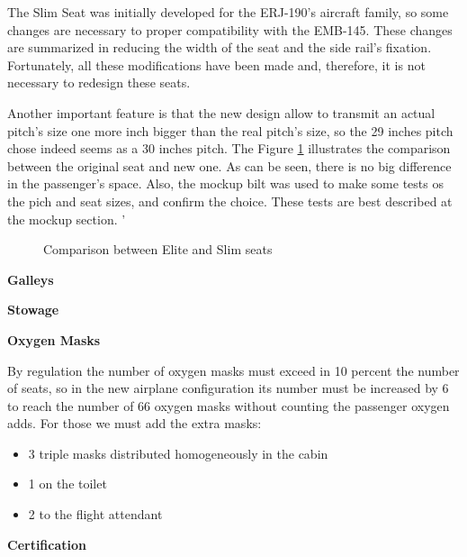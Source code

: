 The Slim Seat was initially developed for the ERJ-190's aircraft family, so some changes are necessary to proper compatibility with the EMB-145. These changes are summarized in reducing the width of the seat and the side rail's fixation. Fortunately, all these modifications have been made and, therefore, it is not necessary to redesign these seats.


Another important feature is that the new design allow to transmit an actual pitch's size one more inch bigger than the real pitch's size, so the 29 inches pitch chose indeed seems as a 30 inches pitch. The Figure \ref{fig:slimelitecomparison} illustrates the comparison between the original seat and new one. As can be seen, there is no big difference in the passenger's space. Also, the mockup bilt was used to make some tests os the pich and seat sizes, and confirm the choice. These tests are best described at the mockup section. '

\begin{figure}[H]
\caption{Comparison between Elite and Slim seats}
\label{fig:slimelitecomparison}
\end{figure}


\textbf{Galleys}


\textbf{Stowage}


\textbf{Oxygen Masks}

By regulation the number of oxygen masks must exceed in 10 percent the number of seats, so in the new airplane configuration its number must be increased by 6 to reach the number of 66 oxygen masks without counting the passenger oxygen adds.
For those we must add the extra masks:

\begin{itemize}
  \item 3 triple masks distributed homogeneously in the cabin
  \item 1 on the toilet
  \item 2 to the flight attendant
\end{itemize}

\textbf{Certification}





